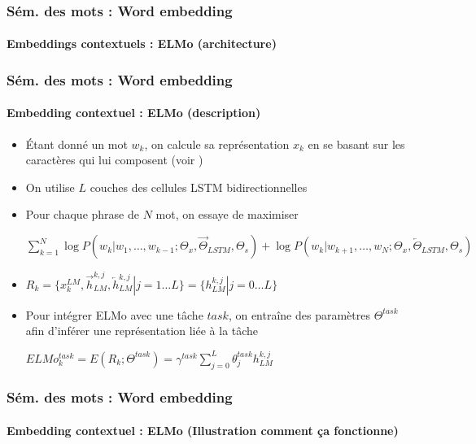 \documentclass[xcolor=table]{beamer}
\begin{document}
\begin{frame}
\frametitle{Sém. des mots : Word embedding}
\framesubtitle{Embeddings contextuels : ELMo (architecture)}
	
	
\end{frame}

\begin{frame}
\frametitle{Sém. des mots : Word embedding}
\framesubtitle{Embedding contextuel : ELMo (description)}

\begin{itemize}
	\item Étant donné un mot $w_k$, on calcule sa représentation $x_k$ en se basant sur les caractères qui lui composent (voir \cite{2015-kim-al})
	\item On utilise $L$ couches des cellules LSTM bidirectionnelles 
	\item Pour chaque  phrase de $N$ mot, on essaye de maximiser\\ 
	\begin{center}
		$\sum_{k=1}^{N} 
	\log P(w_k | w_1,\ldots,w_{k-1}; \Theta_x, \overrightarrow{\Theta}_{LSTM}, \Theta_s)
	+
	\log P(w_k | w_{k+1},\ldots,w_{N}; \Theta_x, \overleftarrow{\Theta}_{LSTM}, \Theta_s)
	$
	\end{center}
	
	\item $R_k = \{x_k^{LM}, \overrightarrow{h}_{LM}^{k, j}, \overleftarrow{h}_{LM}^{k, j} | j= 1 \ldots L \}
	= \{h_{LM}^{k, j} | j= 0 \ldots L \}
	$
	
	\item Pour intégrer ELMo avec une tâche  $task$, on entraîne des paramètres $\Theta^{task}$ afin d'inférer une représentation liée à la tâche \\
	\begin{center}
		$ELMo_k^{task} = E(R_k; \Theta^{task}) = \gamma^{task} \sum_{j=0}^{L} \theta_j^{task} h_{LM}^{k, j}$
	\end{center}
\end{itemize}

\end{frame}

\begin{frame}
\frametitle{Sém. des mots : Word embedding}
\framesubtitle{Embedding contextuel : ELMo (Illustration comment ça fonctionne)}

\vspace{-3pt}
\begin{center}
\end{center}
	
\end{frame}
\end{document}
